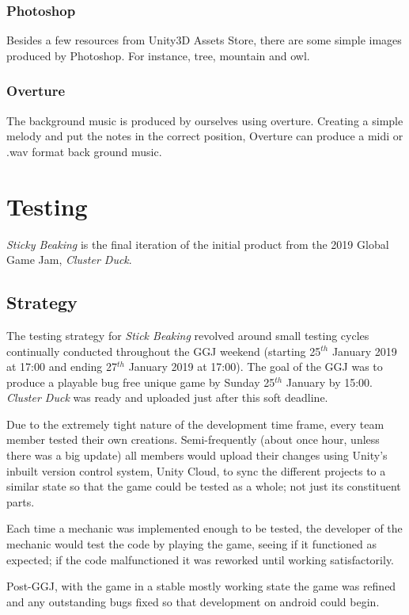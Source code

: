 \documentclass[12pt]{article}
\newcommand{\game}[2]{\textit{#1}}{}
\begin{document}
\subsubsection{Photoshop}
Besides a few resources from Unity3D Assets Store, there are some simple images produced by Photoshop. For instance, tree, mountain and owl.

\subsubsection{Overture}
The background music is produced by ourselves using overture. Creating a simple melody and put the notes in the correct position, Overture can produce a midi or .wav format back ground music.

\section{Testing}
\game{Sticky Beaking}{ } is the final iteration of the initial product from the 2019 Global Game Jam, \game{Cluster Duck}{}.

\subsection{Strategy}
The testing strategy for \game{Stick Beaking}{ } revolved around small testing cycles continually conducted throughout the GGJ weekend (starting 25$^{th}$ January 2019 at 17:00 and ending 27$^{th}$ January 2019 at 17:00). The goal of the GGJ was to produce a playable bug free unique game by Sunday 25$^{th}$ January by 15:00. \game{Cluster Duck}{ } was ready and uploaded just after this soft deadline.

Due to the extremely tight nature of the development time frame, every team member tested their own creations. Semi-frequently (about once hour, unless there was a big update) all members would upload their changes using Unity's inbuilt version control system, Unity Cloud, to sync the different projects to a similar state so that the game could be tested as a whole; not just its constituent parts.

Each time a mechanic was implemented enough to be tested, the developer of the mechanic would test the code by playing the game, seeing if it functioned as expected; if the code malfunctioned it was reworked until working satisfactorily.

Post-GGJ, with the game in a stable mostly working state the game was refined and any outstanding bugs fixed so that development on android could begin.
\end{document}

